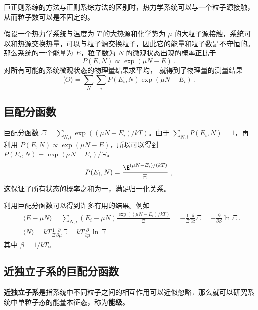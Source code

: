
\begin{issues}
\issueDraft
\end{issues}

巨正则系综的方法与正则系综方法的区别时，热力学系统可以与一个粒子源接触，从而粒子数可以是不固定的。

假设一个热力学系统与温度为 $T$ 的大热源和化学势为 $\mu$ 的大粒子源接触，系统可以和热源交换热量，可以与粒子源交换粒子，因此它的能量和粒子数是不守恒的。那么系统的一个能量为 $E$，粒子数为 $N$ 的微观状态出现的概率正比于
\begin{equation}
P(E,N)\propto \exp(\mu N-E)~.
\end{equation}
对所有可能的系统微观状态的物理量结果求平均， 就得到了物理量的测量结果
\begin{equation}
\langle O\rangle=\sum_{N}\sum_i P(E_i,N)\exp(\mu N-E_i)~.
\end{equation}


\subsection{巨配分函数}
巨配分函数 $\Xi=\sum_{N,i} \exp((\mu N-E_i)/kT)$。由于 $\sum_{N,i} P(E_i,N)=1$，再利用 $P(E,N)\propto \exp(\mu N-E)$，所以可以得到 $P(E_i,N)=\exp(\mu N-E_i)/\Xi$。
\begin{equation}
P(E_i,N)=\frac{\E^{(\mu N - E_i)/(kT)}}{\Xi}~,
\end{equation}
这保证了所有状态的概率之和为一，满足归一化关系。

利用巨配分函数可以得到许多有用的结果。例如
\begin{equation}
\begin{aligned}
&\langle E-\mu N\rangle = \sum_{N,i} (E_i-\mu N) \frac{\exp((\mu N - E_i)/kT)}{\Xi}=-\frac{1}{\Xi}\frac{\partial }{\partial \beta}\Xi=-\frac{\partial}{\partial\beta} \ln \Xi~.\\
&\langle N\rangle =kT \frac{1}{\Xi} \frac{\partial}{\partial \mu}\Xi=kT\frac{\partial}{\partial \mu}\ln \Xi
\end{aligned}
\end{equation}
其中 $\beta=1/kT$。
\subsection{近独立子系的巨配分函数}
\textbf{近独立子系}是指系统中不同粒子之间的相互作用可以近似忽略，那么就可以研究系统中单粒子态的能量本征态，称为\textbf{能级}。

